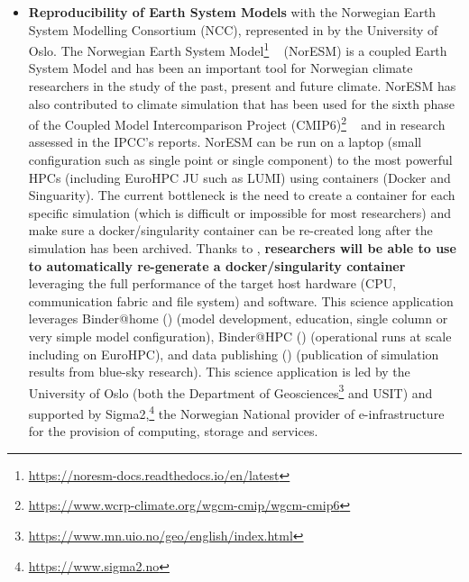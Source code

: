 \begin{itemize}
  to increase the \textbf{reuse of enormous amounts of data} that will be made available to everyone through FAIR@UiO platform.
  FAIR@UiO is led by the University's Center for Information Technology of the University of Oslo
  (USIT\footnote{\url{https://www.usit.uio.no}}).
\item \textbf{Reproducibility of Earth System Models} with the Norwegian Earth System Modelling Consortium (NCC),
   represented in \TheProject by the University of Oslo. The Norwegian Earth System Model\footnote{\url{https://noresm-docs.readthedocs.io/en/latest}}
  ~\cite{Seland2020} (NorESM) is a coupled Earth System Model and has been an important tool for Norwegian
  climate researchers in the study of the past, present and future climate. NorESM has also contributed
  to climate simulation that has been used for the sixth phase of the Coupled Model Intercomparison Project (CMIP6)\footnote{\url{https://www.wcrp-climate.org/wgcm-cmip/wgcm-cmip6}}
   ~\cite{Seland2020} and in research assessed in the IPCC’s reports.
   NorESM can be run on a laptop (small configuration such as single
  point or single component) to the most powerful HPCs (including EuroHPC JU such as LUMI) using containers (Docker and Singuarity).
  The current bottleneck is the need to create a container for each specific
  simulation (which is difficult or impossible for most researchers) and
  make sure a docker/singularity container can be re-created long after the simulation has been archived.
  Thanks to \TheProject, \textbf{researchers will be able to use \repotodocker{} to automatically re-generate a docker/singularity container} leveraging the full performance of the target host hardware (CPU, communication fabric and file system) and software.
  This science application leverages Binder@home () (model
development, education, single column or very simple model configuration), Binder@HPC () (operational runs at scale including on EuroHPC),
and data publishing  () (publication of simulation results from
blue-sky research). This science application is led by the University of Oslo (both the Department of Geosciences\footnote{\url{https://www.mn.uio.no/geo/english/index.html}} and USIT)
and supported by Sigma2,\footnote{\url{https://www.sigma2.no}} the Norwegian National
provider of e-infrastructure for the provision of computing, storage and
services.

\end{itemize}

